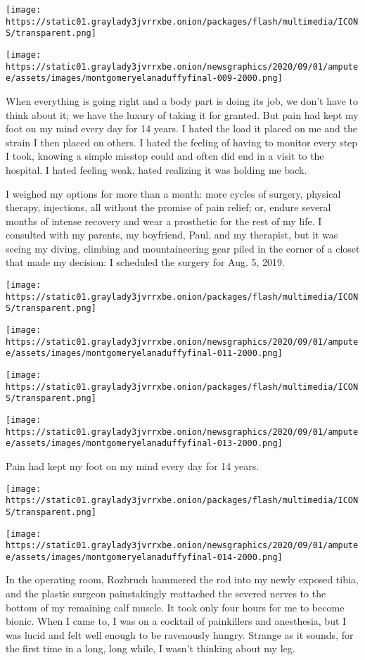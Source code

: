 \texttt{[image: https://static01.graylady3jvrrxbe.onion/packages/flash/multimedia/ICONS/transparent.png]}

\texttt{[image: https://static01.graylady3jvrrxbe.onion/newsgraphics/2020/09/01/amputee/assets/images/montgomeryelanaduffyfinal-009-2000.png]}

When everything is going right and a body part is doing its job, we
don't have to think about it; we have the luxury of taking it for
granted. But pain had kept my foot on my mind every day for 14 years. I
hated the load it placed on me and the strain I then placed on others. I
hated the feeling of having to monitor every step I took, knowing a
simple misstep could and often did end in a visit to the hospital. I
hated feeling weak, hated realizing it was holding me back.

I weighed my options for more than a month: more cycles of surgery,
physical therapy, injections, all without the promise of pain relief;
or, endure several months of intense recovery and wear a prosthetic for
the rest of my life. I consulted with my parents, my boyfriend, Paul,
and my therapist, but it was seeing my diving, climbing and
mountaineering gear piled in the corner of a closet that made my
decision: I scheduled the surgery for Aug. 5, 2019.

\texttt{[image: https://static01.graylady3jvrrxbe.onion/packages/flash/multimedia/ICONS/transparent.png]}

\texttt{[image: https://static01.graylady3jvrrxbe.onion/newsgraphics/2020/09/01/amputee/assets/images/montgomeryelanaduffyfinal-011-2000.png]}

\texttt{[image: https://static01.graylady3jvrrxbe.onion/packages/flash/multimedia/ICONS/transparent.png]}

\texttt{[image: https://static01.graylady3jvrrxbe.onion/newsgraphics/2020/09/01/amputee/assets/images/montgomeryelanaduffyfinal-013-2000.png]}

Pain had kept my foot on my mind every day for 14 years.

\texttt{[image: https://static01.graylady3jvrrxbe.onion/packages/flash/multimedia/ICONS/transparent.png]}

\texttt{[image: https://static01.graylady3jvrrxbe.onion/newsgraphics/2020/09/01/amputee/assets/images/montgomeryelanaduffyfinal-014-2000.png]}

In the operating room, Rozbruch hammered the rod into my newly exposed
tibia, and the plastic surgeon painstakingly reattached the severed
nerves to the bottom of my remaining calf muscle. It took only four
hours for me to become bionic. When I came to, I was on a cocktail of
painkillers and anesthesia, but I was lucid and felt well enough to be
ravenously hungry. Strange as it sounds, for the first time in a long,
long while, I wasn't thinking about my leg.

